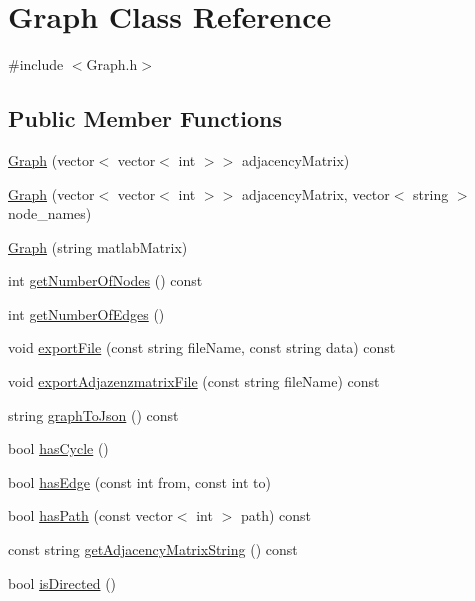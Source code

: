 \hypertarget{class_graph}{\section{Graph Class Reference}
\label{class_graph}
}


{\ttfamily \#include $<$Graph.\-h$>$}

\subsection*{Public Member Functions}
\begin{DoxyCompactItemize}
\item 
\hyperlink{class_graph_a173fa6ec1022bc0f793e3debfd19ad2c}{Graph} (vector$<$ vector$<$ int $>$$>$ adjacency\-Matrix)
\item 
\hyperlink{class_graph_a4141e4b0dc83b8637fed7a88b0abb2a8}{Graph} (vector$<$ vector$<$ int $>$$>$ adjacency\-Matrix, vector$<$ string $>$ node\-\_\-names)
\item 
\hyperlink{class_graph_afa40c944594ef9360902cfa3a754d4ef}{Graph} (string matlab\-Matrix)
\item 
int \hyperlink{class_graph_a217051ac8e8d46ca74e7837f16fbed96}{get\-Number\-Of\-Nodes} () const 
\item 
int \hyperlink{class_graph_ab532b8f903f75621e6ca3469e8dbe0bf}{get\-Number\-Of\-Edges} ()
\item 
void \hyperlink{class_graph_ac38ffcb580b1a9fa57142812aac33c46}{export\-File} (const string file\-Name, const string data) const 
\item 
void \hyperlink{class_graph_a2500973a26b28812291e2c6c142c96f4}{export\-Adjazenzmatrix\-File} (const string file\-Name) const 
\item 
string \hyperlink{class_graph_a027c9787cdf583c5e6d1cc048c3a7c32}{graph\-To\-Json} () const 
\item 
bool \hyperlink{class_graph_a6fcbfa381804b43a67d92eed7f30e1d9}{has\-Cycle} ()
\item 
bool \hyperlink{class_graph_a0a4f1d268e549a905d0451cfdfc6f2db}{has\-Edge} (const int from, const int to)
\item 
bool \hyperlink{class_graph_abc5691276d7bab874ae07a40173d50ec}{has\-Path} (const vector$<$ int $>$ path) const 
\item 
const string \hyperlink{class_graph_ac1eae6c8e3c1b8ef39536c25d8be7fe1}{get\-Adjacency\-Matrix\-String} () const 
\item 
bool \hyperlink{class_graph_afd552af25f5c9672848693d66f27827a}{is\-Directed} ()

\end{DoxyCompactItemize}
